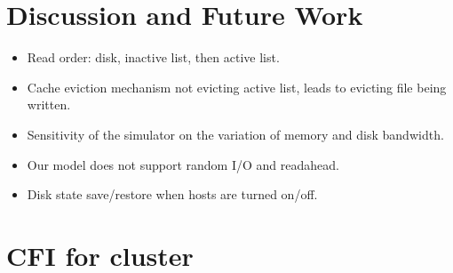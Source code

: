 \documentclass[conference]{IEEEtran}
\begin{document}
	\section{Discussion and Future Work}
		\begin{itemize}
			\item Read order: disk, inactive list, then active list. 
			\item Cache eviction mechanism not evicting active list, leads to evicting file being written.
			\item Sensitivity of the simulator on the variation of memory and disk bandwidth. 
			\item Our model does not support random I/O and readahead.
			\item Disk state save/restore when hosts are turned on/off.
		\end{itemize}
	\section{CFI for cluster}


\end{document}
